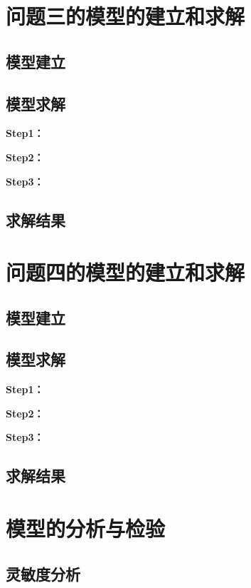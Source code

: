 \documentclass{cumcmthesis}
\begin{document}
\section{问题三的模型的建立和求解}
\subsection{模型建立}

\subsection{模型求解}

\textbf{Step1：} 

\textbf{Step2：} 

\textbf{Step3：} 

\subsection{求解结果}


\section{问题四的模型的建立和求解}
\subsection{模型建立}

\subsection{模型求解}

\textbf{Step1：} 

\textbf{Step2：} 

\textbf{Step3：} 

\subsection{求解结果}


\section{模型的分析与检验}

\subsection{灵敏度分析}
\end{document}
